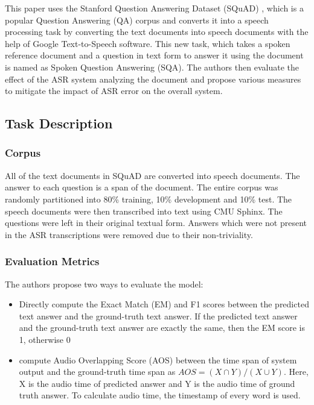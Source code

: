 \documentclass[a4paper]{article}
\begin{document}
This paper uses the Stanford Question Answering Dataset (SQuAD) \cite{rajpurkar2016squad}, which is a popular Question Answering (QA) corpus and converts it into a speech processing task by converting the text documents into speech documents with the help of Google Text-to-Speech software. This new task, which takes a spoken reference document and a question in text form to answer it using the document is named as Spoken Question Answering (SQA). The authors then evaluate the effect of the ASR system analyzing the document and propose various measures to mitigate the impact of ASR error on the overall system.

\subsection{Task Description}
\subsubsection{Corpus}
All of the text documents in SQuAD are converted into speech documents. The answer to each question is a span of the document. The entire corpus was randomly partitioned into 80\% training, 10\% development and 10\% test. The speech documents were then transcribed into text using CMU Sphinx. The questions were left in their original textual form. Answers which were not present in the ASR transcriptions were removed due to their non-triviality.

\subsubsection{Evaluation Metrics}
The authors propose two ways to evaluate the model:

\begin{itemize}
  \item Directly compute the Exact Match (EM) and F1 scores between the predicted text answer and the ground-truth text answer. If the predicted text answer and the ground-truth text answer are exactly the same, then the EM score is 1, otherwise 0

  \item  compute Audio Overlapping Score (AOS) between the time span of system output and the ground-truth time span as $AOS = (X \cap Y)/(X \cup Y)$. Here, X is the audio time of predicted answer and Y is the audio time of ground truth answer. To calculate audio time, the timestamp of every word is used.
\end{itemize}
\end{document}
